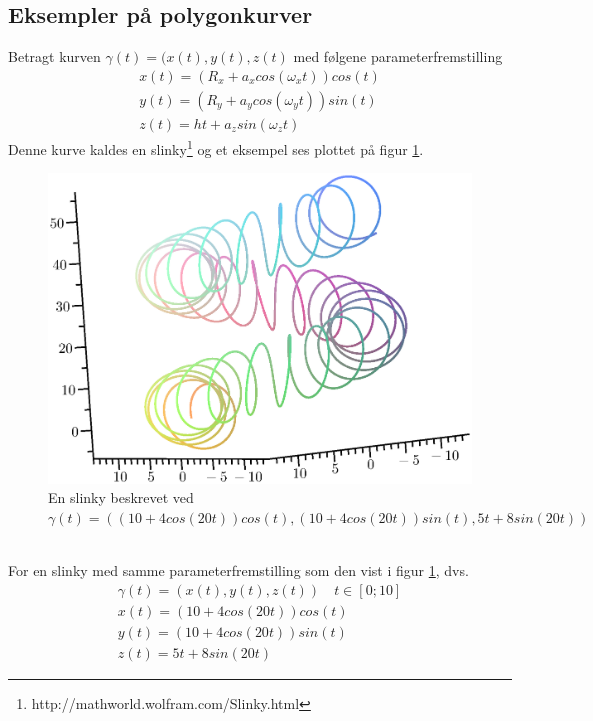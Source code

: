 \subsection{Eksempler på polygonkurver}
Betragt kurven \(\gamma(t)=(x(t),y(t),z(t)\) med følgene parameterfremstilling
\begin{equation}
\begin{gathered}
x(t)=(R_x+a_xcos(\omega_x t))cos(t) \\
y(t)=(R_y+a_ycos(\omega_y t))sin(t) \\
z(t)=ht+a_zsin(\omega_z t)
\end{gathered}
\end{equation}
Denne kurve kaldes en slinky\footnote{http://mathworld.wolfram.com/Slinky.html} og et eksempel ses plottet på figur \ref{pureslinky}.
\begin{figure}[ht]
\center
\includegraphics[scale=0.5]{pictures/pureslinky.eps}
\caption{En slinky beskrevet ved \(\gamma(t)=((10+4cos(20t))cos(t), (10+4cos(20t))sin(t), 5t+8sin(20t))\)}
\label{pureslinky}
\end{figure}
\\
For en slinky med samme parameterfremstilling som den vist i figur \ref{pureslinky}, dvs.
\begin{equation}
\begin{gathered}
\gamma(t)=(x(t),y(t),z(t)) \quad t \in [0;10] \\
x(t)=(10+4cos(20t))cos(t) \\
y(t)=(10+4cos(20t))sin(t) \\
z(t)=5t+8sin(20t)
\end{gathered}
\end{equation}
